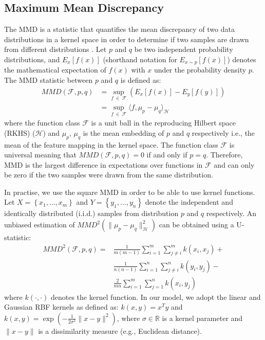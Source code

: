 \documentclass{mpaper}
\begin{document}
\subsection{Maximum Mean Discrepancy}\label{chap2:MMD}
The MMD is a statistic that quantifies the mean discrepancy of two data distributions in a kernel space in order to determine if two samples are drawn from different distributions \cite{OriginalMMD}. Let $p$ and $q$ be two independent probability distributions, and $E_x\left[f\left(x\right)\right]$ (shorthand notation for $E_{x \sim p}\left[f\left(x\right)\right]$) denotes the mathematical expectation of $f\left(x\right)$ with $x$ under the probability density $p$. The MMD statistic  between $p$ and $q$ is defined as:
\begin{equation}
\begin{aligned}
    	MMD\left( \boldsymbol{\mathcal{F}},p, q \right) & = \sup_{f\ \in\ \boldsymbol{\mathcal{F}}} {\left( E_x \left[ f\left( x \right) \right] -E_y \left[ f \left( y \right) \right] \right)} \\
    	& = {\sup_{f\ \in\ \boldsymbol{\mathcal{F}}}{\langle f,\mu_p-\mu_q\rangle_{\boldsymbol{\mathcal{H}}}}}
\end{aligned}
\end{equation}
where the function class $\boldsymbol{\mathcal{F}}$ is a unit ball in the reproducing Hilbert space (RKHS) ($\boldsymbol{\mathcal{H}}$) and $\mu_p$, $\mu_q$ is the mean embedding of $p$ and $q$ respectively i.e., the mean of the feature mapping in the kernel space. The function class $\boldsymbol{\mathcal{F}}$ is universal meaning that $MMD\left(\boldsymbol{\mathcal{F}},p,q\right)=0$ if and only if $p=q$. Therefore, MMD is the largest difference in expectations over functions in $\boldsymbol{\mathcal{F}}$ and can only be zero if the two samples were drawn from the same distribution.

In practise, we use the square MMD in order to be able to use kernel functions. Let $X=\left\{x_1,...,x_m\right\}$ and $Y=\left\{y_1,...,y_n\right\}$ denote the independent and identically distributed (i.i.d.) samples from distribution $p$ and $q$ respectively. An unbiased estimation of $MMD^2 \left( \parallel{\mu_p-\mu_q}\parallel^2_{\boldsymbol{\mathcal{H}}} \right)$ can be obtained using a U-statistic:
\begin{equation}
\begin{aligned}
	MMD^2\left(\mathcal{F},p,q\right) = &\frac{1}{m(m-1)}\sum_{i=1}^{m}\sum_{j\neq i}^{m}k\left(x_i,x_j\right) + \\
	& \frac{1}{n(n-1)}\sum_{i=1}^{n}\sum_{j\neq i}^{n}k\left(y_i,y_j\right) - \\
	& \frac{2}{mn}\sum_{i=1}^{m}\sum_{j=1}^{n}k\left(x_i,y_j\right) 
\end{aligned}
\end{equation}
where $k(\cdot, \cdot)$ denotes the kernel function. In our model,
we adopt the linear and Gaussian RBF kernels %
as defined as:
$k(x,y) = x^Ty$ and $k(x,y) = \exp\left(-\frac{1}{2\sigma^2}\parallel x - y \parallel^2\right)$, where $\sigma \in \mathbb{R}$ is a kernel parameter and $\parallel x - y\parallel$ is a dissimilarity measure (e.g., Euclidean distance). 
\end{document}
